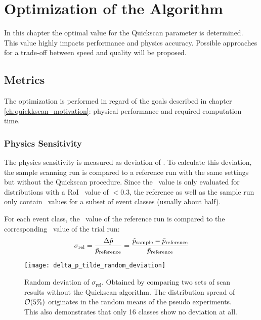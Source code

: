 
\chapter{Optimization of the Algorithm}
In this chapter the optimal value for the Quickscan parameter \paramregions is determined. This value highly impacts performance and physics accuracy. Possible approaches for a trade-off between speed and quality will be proposed.

\section{Metrics}
The optimization is performed in regard of the goals described in chapter \ref{ch:quickkscan_motivation}: physical performance and required computation time.

\subsection{Physics Sensitivity}
The physics sensitivity is measured as deviation of \ptilde. To calculate this deviation, the sample scanning run is compared to a reference run with the same settings but without the Quickscan procedure. Since the \ptilde~value is only evaluated for distributions with a RoI \p~value of $< 0.3$, the reference as well as the sample run only contain \ptilde~values for a subset of event classes (usually about half).

For each event class, the \ptilde~value of the reference run is compared to the corresponding \ptilde~value of the trial run:
\begin{equation}
	\sigma_\mathrm{rel} = \frac{\Delta \tilde{p}}{\tilde{p}_\mathrm{reference}} = \frac{\tilde{p}_\mathrm{sample} - \tilde{p}_\mathrm{reference}}{\tilde{p}_\mathrm{reference}}
\end{equation}

\begin{figure}[htbp]
	\centering
	\texttt{[image: delta\_p\_tilde\_random\_deviation]}
	\caption{Random deviation of $\sigma_\mathrm{rel}$. Obtained by comparing two sets of scan results without the Quickscan algorithm. The distribution spread of $\order{\unit{5}{\%}}$ originates in the random means of the pseudo experiments. This also demonstrates that only 16 classes show no deviation at all.}
	\label{fig:delta_p_tilde_random_deviation}
\end{figure}

